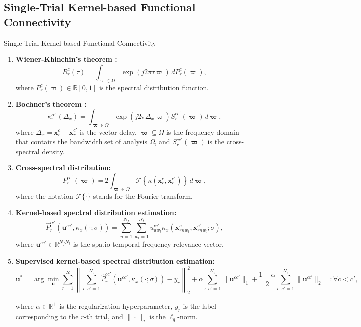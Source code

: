 \documentclass[aspectratio=169]{beamer}
\let\oldcite\cite %
\renewcommand{\cite}[1]{{\tiny\oldcite{#1}}}
\newcommand{\ve}[1]{\bm {#1}}
\begin{document}
\subsection{Single-Trial Kernel-based Functional Connectivity}

\begin{frame}[allowframebreaks]{Single-Trial Kernel-based Functional Connectivity}
    \begin{enumerate}
        \item \textbf{Wiener-Khinchin's theorem \cite{cohen1998generalization}:} 
        \[
        R^{c}_{r}(\tau) = \int_{\varpi \in \Omega} \exp(j2\pi \tau \varpi) \, dP^{c}_{r}(\varpi),
        \]
        where $P^{c}_{r}(\varpi) \in \mathbb{R}[0,1]$ is the spectral distribution function.
        
        \item \textbf{Bochner's theorem \cite{bochner2020harmonic}:} 
        \[
        \kappa^{cc'}_{r}(\Delta_{x}) = \int_{\ve{\varpi} \in \Omega} \exp(j2\pi \Delta_{x}^{\top} \varpi) S^{cc'}_{r}(\ve{\varpi}) \, d\ve{\varpi},
        \]
        where $\Delta_{x} = \mathbf{x}^{c}_{r} - \mathbf{x}^{c'}_{r}$ is the vector delay, $\ve{\varpi} \subseteq \varOmega$ is the frequency domain that contains the bandwidth set of analysis $\varOmega$, and $S^{cc'}_{r}(\ve{\varpi})$ is the cross-spectral density.

        \item \textbf{Cross-spectral distribution:} 
        \[
        P^{cc'}_{r}(\ve{\varpi}) = 2 \int_{\ve{\varpi} \in \varOmega} \mathscr{F}\left\{\kappa(\mathbf{x}^{c}_{r}, \mathbf{x}^{c'}_{r}) \right\} \, d\ve{\varpi},
        \]
        where the notation $\mathscr{F}\{\cdot\}$ stands for the Fourier transform.

        \item \textbf{Kernel-based spectral distribution estimation:}
        \[
        \hat{P}^{cc'}_{r}(\mathbf{u}^{cc'},\kappa_x\left(\cdot;\sigma\right)) = \sum_{n=1}^{N_f}\sum_{w_t=1}^{N_t} u_{nw_t}^{cc'}\kappa_x\left(\mathbf{x}^{c}_{rnw_t},\mathbf{x}^{c'}_{rnw_t};\sigma\right),
        \]
        where $\mathbf{u}^{cc'} \in \mathbb{R}^{N_f N_t}$ is the spatio-temporal-frequency relevance vector.

        \item \textbf{Supervised kernel-based spectral distribution estimation:}
        {\scriptsize
        \[
        \mathbf{u}^* = \arg \min_{\mathbf{u}} \sum_{r=1}^{R} \left\|\sum_{c,c'=1}^{N_c}\hat{P}^{cc'}_{r}(\mathbf{u}^{cc'},\kappa_x(\cdot;\sigma))-y_r\right\|^2_2 + \alpha \sum_{c,c'=1}^{N_c}\|\mathbf{u}^{cc'}\|_1 + \frac{1-\alpha}{2} \sum_{c,c'=1}^{N_c}\|\mathbf{u}^{cc'}\|_2 \quad :  \forall c < c',
        \]}

        where $\alpha \in \mathbb{R}^+$ is the regularization hyperparameter, $y_r$ is the label corresponding to the $r$-th trial, and $\| \cdot \|_q$ is the $\ell_q$-norm.
    \end{enumerate}
\end{frame}
\end{document}
